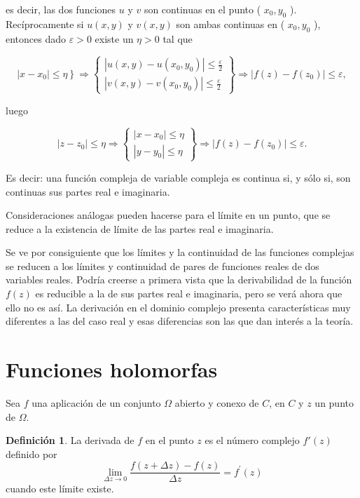 \documentclass[10pt]{article}
\theoremstyle{plain}
\theoremstyle{definition}
\newtheorem{definition}[theorem]{Definición}
\theoremstyle{remark}
\begin{document}
es decir, las dos funciones $u$ y $v$ son continuas en el punto ( $x_0, y_0$ ).\\
Recíprocamente si $u(x, y)$ y $v(x, y)$ son ambas continuas en ( $x_0, y_0$ ), entonces dado $\varepsilon>0$ existe un $\eta>0$ tal que

$$
\left.\left|x-x_{0}\right| \leqslant \eta\right\} \Rightarrow\left\{\begin{array}{l}
\left|u(x, y)-u\left(x_{0}, y_{0}\right)\right| \leqslant \frac{\varepsilon}{2} \\
\left|v(x, y)-v\left(x_{0}, y_{0}\right)\right| \leqslant \frac{\varepsilon}{2}
\end{array}\right\} \Rightarrow\left|f(z)-f\left(z_{0}\right)\right| \leqslant \varepsilon,
$$

luego

$$
\left|z-z_{0}\right| \leqslant \eta \Rightarrow\left\{\begin{array}{c}
\left|x-x_{0}\right| \leqslant \eta \\
\left|y-y_{0}\right| \leqslant \eta
\end{array}\right\} \Rightarrow\left|f(z)-f\left(z_{0}\right)\right| \leqslant \varepsilon .
$$

Es decir: una función compleja de variable compleja es continua si, y sólo si, son continuas sus partes real e imaginaria.

Consideraciones análogas pueden hacerse para el límite en un punto, que se reduce a la existencia de límite de las partes real e imaginaria.

Se ve por consiguiente que los límites y la continuidad de las funciones complejas se reducen a los límites y continuidad de pares de funciones reales de dos variables reales. Podría creerse a primera vista que la derivabilidad de la función $f(z)$ es reducible a la de sus partes real e imaginaria, pero se verá ahora que ello no es así. La derivación en el dominio complejo presenta características muy diferentes a las del caso real y esas diferencias son las que dan interés a la teoría.


\section{Funciones holomorfas}
Sea $f$ una aplicación de un conjunto $\Omega$ abierto y conexo de $C$, en $C$ y $z$ un punto de $\Omega$.

\begin{definition}
La derivada de $f$ en el punto $z$ es el número complejo $f'(z)$ definido por
\begin{equation*}
\lim _{\Delta z \rightarrow 0} \frac{f(z+\Delta z)-f(z)}{\Delta z}=f^{\prime}(z) \tag{3-1}
\end{equation*}
cuando este límite existe.
\end{definition}
\end{document}

